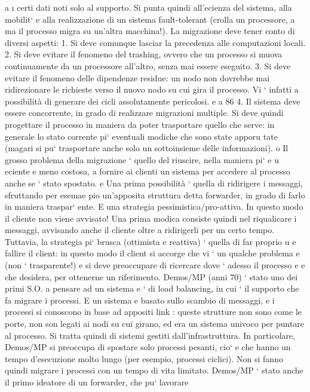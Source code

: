 \documentclass[a4paper,12pt]{article}
\begin{document}
a
\i{}
certi dati noti solo al supporto. Si punta quindi all'ecienza del sistema, alla
mobilit` e alla realizzazione di un sistema fault-tolerant (crolla un processore,
a
ma il processo migra su un'altra macchina!).
La migrazione deve tener conto di diversi aspetti:
1. Si deve comunque lasciar la precedenza alle computazioni locali.
2. Si deve evitare il fenomeno del trashing, ovvero che un processo si muova
continuamente da un processore all'altro, senza mai essere eseguito.
3. Si deve evitare il fenomeno delle dipendenze residue: un nodo non dovrebbe
mai ridirezionare le richieste verso il nuovo nodo su cui gira il processo.
Vi ` infatti a possibilità di generare dei cicli assolutamente pericolosi.
e
a
86
4. Il sistema deve essere concorrente, in grado di realizzare migrazioni multiple.
Si deve quindi progettare il processo in maniera da poter trasportare quello che
serve: in generale lo stato corrente pi` eventuali modiche che sono state apporu
tate (magari si pu` trasportare anche solo un sottoinsieme delle informazioni).
o
Il grosso problema della migrazione ` quello del riuscire, nella maniera pi`
e
u
eciente e meno costosa, a fornire ai clienti un sistema per accedere al processo
anche se ` stato spostato.
e
Una prima possibilità ` quella di ridirigere i messaggi, sfruttando per esemae
pio un'apposita struttura detta forwarder, in grado di farlo in maniera traspar`
ente. E una strategia pessimistica/pro-attiva. In questo modo il cliente non
viene avvisato! Una prima modica consiste quindi nel riqualicare i messaggi,
avvisando anche il cliente oltre a ridirigerli per un certo tempo.
Tuttavia, la strategia pi` brusca (ottimista e reattiva) ` quella di far proprio
u
e
fallire il client: in questo modo il client si accorge che vi ` un qualche problema
e
(non ` trasparente!) e si deve preoccupare di ricercare dove ` adesso il processo
e
e
che desidera, per ottenerne un riferimento.
Demos/MP (anni 70) ` stato uno dei primi S.O. a pensare ad un sistema
e
`
di load balancing, in cui ` il supporto che fa migrare i processi. E un sistema
e
basato sullo scambio di messaggi, e i processi si conoscono in base ad appositi
link : queste strutture non sono come le porte, non son legati ai nodi su cui
girano, ed era un sistema univoco per puntare al processo. Si tratta quindi di
sistemi gestiti dall'infrastruttura.
In particolare, Demos/MP si preoccupa di spostare solo processi pesanti, cio`
e
che hanno un tempo d'esecuzione molto lungo (per esempio, processi ciclici).
Non si fanno quindi migrare i processi con un tempo di vita limitato.
Demos/MP ` stato anche il primo ideatore di un forwarder, che pu` lavorare
\end{document}
